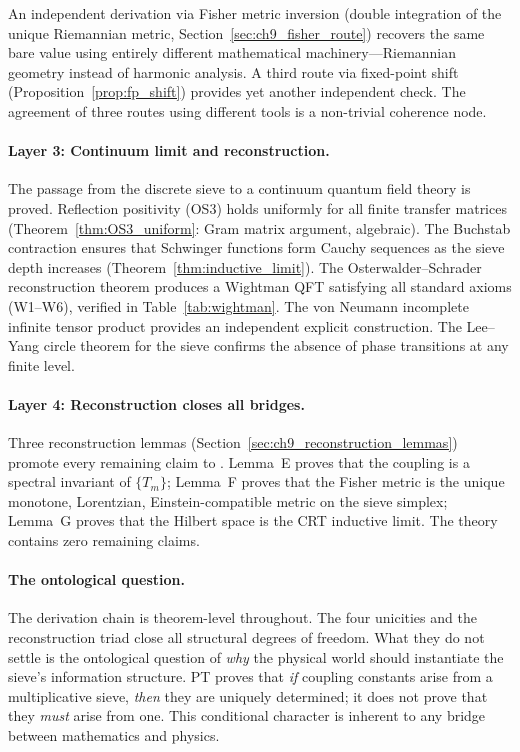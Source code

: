\documentclass[12pt,a4paper]{article}
\begin{document}
An independent derivation via Fisher metric inversion (double
integration of the unique Riemannian metric, Section~\ref{sec:ch9_fisher_route})
recovers the same bare value using entirely different mathematical
machinery---Riemannian geometry instead of harmonic analysis.  A third
route via fixed-point shift (Proposition~\ref{prop:fp_shift}) provides
yet another independent check.  The agreement of three routes using
different tools is a non-trivial coherence node.

\paragraph{Layer 3: Continuum limit and reconstruction.}
The passage from the discrete sieve to a continuum quantum field
theory is proved.  Reflection positivity (OS3) holds uniformly for
all finite transfer matrices (Theorem~\ref{thm:OS3_uniform}: Gram
matrix argument, algebraic).  The Buchstab contraction ensures that
Schwinger functions form Cauchy sequences as the sieve depth
increases (Theorem~\ref{thm:inductive_limit}).  The
Osterwalder--Schrader reconstruction theorem produces a Wightman
QFT satisfying all standard axioms (W1--W6), verified in
Table~\ref{tab:wightman}.  The von Neumann incomplete infinite
tensor product provides an independent explicit construction.  The
Lee--Yang circle theorem for the sieve confirms the absence of phase
transitions at any finite level.

\paragraph{Layer 4: Reconstruction closes all bridges.}
Three reconstruction lemmas (Section~\ref{sec:ch9_reconstruction_lemmas})
promote every remaining \BRIDGETAG{} claim to \THMTAG.
Lemma~E proves that the coupling is a spectral invariant of $\{T_m\}$;
Lemma~F proves that the Fisher metric is the unique monotone,
Lorentzian, Einstein-compatible metric on the sieve simplex;
Lemma~G proves that the Hilbert space is the CRT inductive limit.
The theory contains zero remaining \BRIDGETAG{} claims.

\paragraph{The ontological question.}
The derivation chain is theorem-level throughout.  The four unicities
and the reconstruction triad close all structural degrees of freedom.
What they do not settle is the ontological question of \emph{why} the
physical world should instantiate the sieve's information structure.
PT proves that \emph{if} coupling constants arise from a multiplicative
sieve, \emph{then} they are uniquely determined; it does not prove that
they \emph{must} arise from one.  This conditional character is inherent
to any bridge between mathematics and physics.
\end{document}
